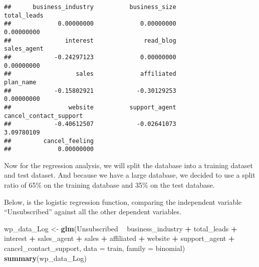 \documentclass[]{article}
\newenvironment{Shaded}{\begin{snugshade}}{\end{snugshade}}
\newcommand{\KeywordTok}[1]{\textcolor[rgb]{0.13,0.29,0.53}{\textbf{#1}}}
\newcommand{\DataTypeTok}[1]{\textcolor[rgb]{0.13,0.29,0.53}{#1}}
\newcommand{\DecValTok}[1]{\textcolor[rgb]{0.00,0.00,0.81}{#1}}
\newcommand{\FloatTok}[1]{\textcolor[rgb]{0.00,0.00,0.81}{#1}}
\newcommand{\StringTok}[1]{\textcolor[rgb]{0.31,0.60,0.02}{#1}}
\newcommand{\OtherTok}[1]{\textcolor[rgb]{0.56,0.35,0.01}{#1}}
\newcommand{\OperatorTok}[1]{\textcolor[rgb]{0.81,0.36,0.00}{\textbf{#1}}}
\newcommand{\NormalTok}[1]{#1}
\begin{document}
\begin{verbatim}
##      business_industry          business_size            total_leads 
##             0.00000000             0.00000000             0.00000000 
##               interest              read_blog            sales_agent 
##            -0.24297123             0.00000000             0.00000000 
##                  sales             affiliated              plan_name 
##            -0.15802921            -0.30129253             0.00000000 
##                website          support_agent cancel_contact_support 
##            -0.40612507            -0.02641073             3.09780109 
##         cancel_feeling 
##             0.00000000
\end{verbatim}

Now for the regression analysis, we will split the database into a
training dataset and test dataset. And because we have a large database,
we decided to use a split ratio of 65\% on the training database and
35\% on the test database.

\begin{Shaded}
\end{Shaded}

Below, is the logistic regression function, comparing the independent
variable ``Unsubscribed'' against all the other dependent variables.

\begin{Shaded}
\begin{Highlighting}[]
\NormalTok{wp_data_Log <-}\StringTok{ }\KeywordTok{glm}\NormalTok{(Unsubscribed }\OperatorTok{~}\StringTok{ }\NormalTok{business_industry }\OperatorTok{+}\StringTok{ }\NormalTok{total_leads }\OperatorTok{+}\StringTok{ }\NormalTok{interest }\OperatorTok{+}\StringTok{ }\NormalTok{sales_agent }\OperatorTok{+}\StringTok{ }\NormalTok{sales }\OperatorTok{+}\StringTok{ }\NormalTok{affiliated }\OperatorTok{+}\StringTok{ }\NormalTok{website }\OperatorTok{+}\StringTok{ }\NormalTok{support_agent }\OperatorTok{+}\StringTok{ }\NormalTok{cancel_contact_support, }\DataTypeTok{data =}\NormalTok{ train, }\DataTypeTok{family =}\NormalTok{ binomial)}
\KeywordTok{summary}\NormalTok{(wp_data_Log)}
\end{Highlighting}
\end{Shaded}
\end{document}
